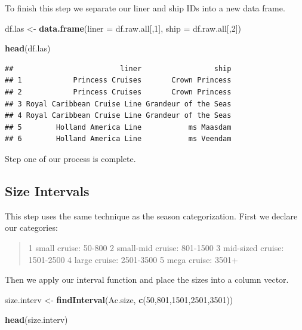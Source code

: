 \documentclass[
  11,
]{book}
\newenvironment{Shaded}{\begin{snugshade}}{\end{snugshade}}
\newcommand{\AttributeTok}[1]{\textcolor[rgb]{0.27,0.27,0.27}{#1}}
\newcommand{\DecValTok}[1]{\textcolor[rgb]{0.06,0.06,0.06}{#1}}
\newcommand{\FunctionTok}[1]{\textcolor[rgb]{0.27,0.27,0.27}{\textbf{#1}}}
\newcommand{\NormalTok}[1]{#1}
\newcommand{\OtherTok}[1]{\textcolor[rgb]{0.37,0.37,0.37}{#1}}
\begin{document}
To finish this step we separate our liner and ship IDs into a new data frame.

\begin{Shaded}
\begin{Highlighting}[]
\NormalTok{df.las }\OtherTok{\textless{}{-}} \FunctionTok{data.frame}\NormalTok{(}\AttributeTok{liner =}\NormalTok{ df.raw.all[,}\DecValTok{1}\NormalTok{],}
                     \AttributeTok{ship =}\NormalTok{ df.raw.all[,}\DecValTok{2}\NormalTok{])}

\FunctionTok{head}\NormalTok{(df.las)}
\end{Highlighting}
\end{Shaded}

\begin{verbatim}
##                         liner                 ship
## 1            Princess Cruises       Crown Princess
## 2            Princess Cruises       Crown Princess
## 3 Royal Caribbean Cruise Line Grandeur of the Seas
## 4 Royal Caribbean Cruise Line Grandeur of the Seas
## 5        Holland America Line           ms Maasdam
## 6        Holland America Line           ms Veendam
\end{verbatim}

Step one of our process is complete.

\hypertarget{size-intervals}{%
\subsection*{Size Intervals}\label{size-intervals}}


This step uses the same technique as the season categorization. First we declare our categories:

\begin{quote}
1 small cruise: 50-800 2 small-mid cruise: 801-1500 3 mid-sized cruise: 1501-2500 4 large cruise: 2501-3500 5 mega cruise: 3501+
\end{quote}

Then we apply our interval function and place the sizes into a column vector.

\begin{Shaded}
\begin{Highlighting}[]
\NormalTok{size.interv }\OtherTok{\textless{}{-}} \FunctionTok{findInterval}\NormalTok{(Ac.size, }\FunctionTok{c}\NormalTok{(}\DecValTok{50}\NormalTok{,}\DecValTok{801}\NormalTok{,}\DecValTok{1501}\NormalTok{,}\DecValTok{2501}\NormalTok{,}\DecValTok{3501}\NormalTok{))}

\FunctionTok{head}\NormalTok{(size.interv)}
\end{Highlighting}
\end{Shaded}
\end{document}
